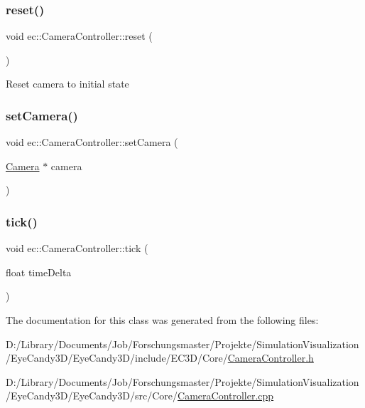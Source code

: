 \mbox{\label{classec_1_1_camera_controller_a10d1642f398f155fa06c4c74961fe91f}} 
\subsubsection{\texorpdfstring{reset()}{reset()}}
{\footnotesize\ttfamily void ec\+::\+Camera\+Controller\+::reset (\begin{DoxyParamCaption}{ }\end{DoxyParamCaption})}

Reset camera to initial state \mbox{\label{classec_1_1_camera_controller_a74d3b80913b69dce0bae61a651c3b49b}} 
\subsubsection{\texorpdfstring{set\+Camera()}{setCamera()}}
{\footnotesize\ttfamily void ec\+::\+Camera\+Controller\+::set\+Camera (\begin{DoxyParamCaption}\item[{\mbox{\hyperlink{classec_1_1_camera}{Camera}} $\ast$}]{camera }\end{DoxyParamCaption})}

\mbox{\label{classec_1_1_camera_controller_a82055ad6c8797937a8ec17234ab08758}} 
\subsubsection{\texorpdfstring{tick()}{tick()}}
{\footnotesize\ttfamily void ec\+::\+Camera\+Controller\+::tick (\begin{DoxyParamCaption}\item[{float}]{time\+Delta }\end{DoxyParamCaption})}



The documentation for this class was generated from the following files\+:\begin{DoxyCompactItemize}
\item 
D\+:/\+Library/\+Documents/\+Job/\+Forschungsmaster/\+Projekte/\+Simulation\+Visualization/\+Eye\+Candy3\+D/\+Eye\+Candy3\+D/include/\+E\+C3\+D/\+Core/\mbox{\hyperlink{_camera_controller_8h}{Camera\+Controller.\+h}}\item 
D\+:/\+Library/\+Documents/\+Job/\+Forschungsmaster/\+Projekte/\+Simulation\+Visualization/\+Eye\+Candy3\+D/\+Eye\+Candy3\+D/src/\+Core/\mbox{\hyperlink{_camera_controller_8cpp}{Camera\+Controller.\+cpp}}\end{DoxyCompactItemize}
